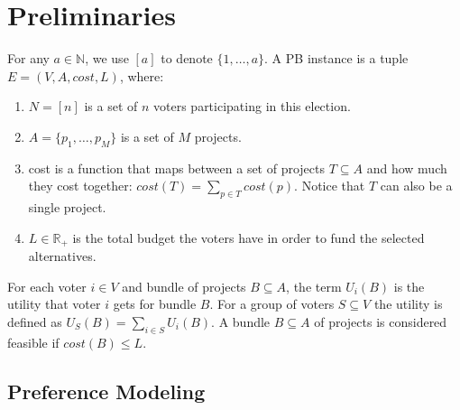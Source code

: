 \documentclass[runningheads]{llncs}
\newcommand{\kibitz}[2]{\ifnum\Comments=1{\color{#1}{#2}}\fi}
\newcommand{\rmr}[1]{\kibitz{red}{[Reshef says:#1]}}
\newcommand{\rf}[1]{\kibitz{blue}{[Roy says:#1]}}
\begin{document}
\section{Preliminaries}
For any  $a\in \mathbb{N}$,  we use   $[a]$ to denote $\{1,\ldots,a\}$.
A PB instance is a tuple $E=(V,A,cost,L)$, where:
\begin{enumerate}
    \item $N=[n]$ is a set of $n$ voters participating in this election.
    \item $A=\{p_1,\ldots,p_M\}$ is a set of $M$  projects. 
    \item cost is a function that maps between a set of projects $T\subseteq A$ and how much they cost together: $cost(T)=\sum_{p\in T}cost(p)$. Notice that $T$ can also be a single project. 
    \item $L\in \mathbb{R}_+$ is the total budget the voters have in order to fund the selected alternatives. 
\end{enumerate}
 
     For each voter $i\in V$ and bundle of projects $B\subseteq A$, the term $U_i(B)$ is the utility that voter $i$ gets for bundle $B$. For a group of voters $S\subseteq V$ the utility is defined as $U_S(B)=\sum_{i\in S}U_i(B).$
A  bundle $B\subseteq A$ of projects   is considered  feasible if  $cost(B)\leq L$. 



\subsection{Preference Modeling}\label{input}
\end{document}
